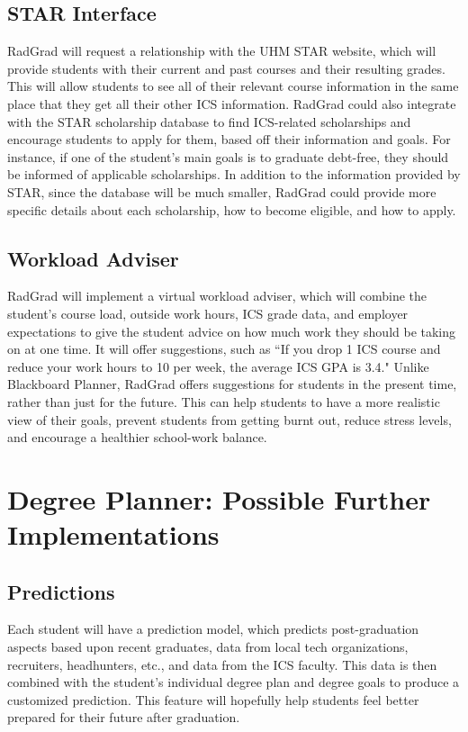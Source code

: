 \subsection{STAR Interface}
RadGrad will request a relationship with the UHM STAR website, which will provide students with their current and past courses and their resulting grades. This will allow students to see all of their relevant course information in the same place that they get all their other ICS information. RadGrad could also integrate with the STAR scholarship database to find ICS-related scholarships and encourage students to apply for them, based off their information and goals. For instance, if one of the student's main goals is to graduate debt-free, they should be informed of applicable scholarships. In addition to the information provided by STAR, since the database will be much smaller, RadGrad could provide more specific details about each scholarship, how to become eligible, and how to apply. 
\subsection{Workload Adviser}
RadGrad will implement a virtual workload adviser, which will combine the student's course load, outside work hours, ICS grade data, and employer expectations to give the student advice on how much work they should be taking on at one time. It will offer suggestions, such as ``If you drop 1 ICS course and reduce your work hours to 10 per week, the average ICS GPA is 3.4." Unlike Blackboard Planner, RadGrad offers suggestions for students in the present time, rather than just for the future. This can help students to have a more realistic view of their goals, prevent students from getting burnt out, reduce stress levels, and encourage a healthier school-work balance.

\section{Degree Planner: Possible Further Implementations}
\subsection{Predictions}
Each student will have a prediction model, which predicts post-graduation aspects based upon recent graduates, data from local tech organizations, recruiters, headhunters, etc., and data from the ICS faculty. This data is then combined with the student's individual degree plan and degree goals to produce a customized prediction.  This feature will hopefully help students feel better prepared for their future after graduation.

